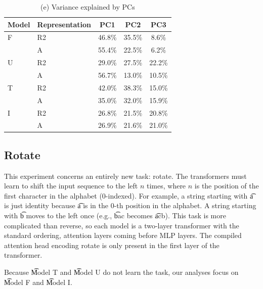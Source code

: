 \begin{table}[h]
\vspace{1.5em}
\centering
\begin{tabular}{llccc}
\toprule
\textbf{Model} & \textbf{Representation} & \textbf{PC1} & \textbf{PC2} & \textbf{PC3} \\
\midrule
F & R2 & 46.8\% & 35.5\% & 8.6\% \\
  & A & 55.4\% & 22.5\% & 6.2\% \\
\midrule
U & R2 & 29.0\% & 27.5\% & 22.2\% \\
  & A & 56.7\% & 13.0\% & 10.5\% \\
\midrule
T & R2 & 42.0\% & 38.3\% & 15.0\% \\
  & A & 35.0\% & 32.0\% & 15.9\% \\
\midrule
I & R2 & 26.8\% & 21.5\% & 20.8\% \\
  & A & 26.9\% & 21.6\% & 21.0\% \\
\bottomrule
\end{tabular}
\vspace{1.5em}
\caption*{(e) Variance explained by PCs}
\end{table}

\vspace{3em}
\subsection{Rotate}
\label{app:experiments-rotate}

This experiment concerns an entirely new task: rotate. The transformers must learn to shift the input
sequence to the left $n$ times, where $n$ is the position of the first character in the alphabet (0-indexed).
For example, a string starting with \t{a} is just identity because \t{a} is in the $0$-th position in the
alphabet. A string starting with \t{b} moves to the left once (e.g., \t{bac} becomes \t{acb}). This task
is more complicated than reverse, so each model is a two-layer transformer with the standard ordering, attention
layers coming before MLP layers. The compiled attention head encoding rotate is only present in the first layer of the transformer.

Because \t{Model T} and \t{Model U} do not learn the task, our analyses focus on \t{Model F} and \t{Model I}.

